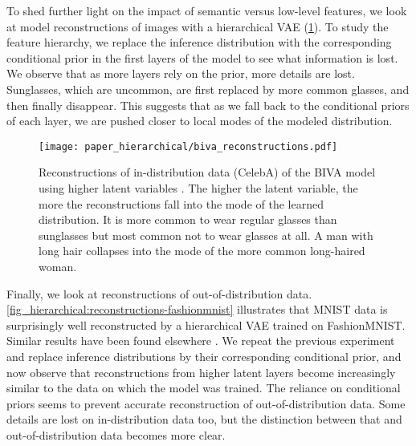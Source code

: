 {To shed further light on the impact of semantic versus low-level features, we look at model reconstructions of images with a hierarchical VAE (\cref{fig_hierarchical:biva-reconstructions-celeba}).
To study the feature hierarchy, we replace the inference distribution with the corresponding conditional prior in the first layers of the model to see what information is lost.
We observe that as more layers rely on the prior, more details are lost.
Sunglasses, which are uncommon, are first replaced by more common glasses, and then finally disappear.
This suggests that as we fall back to the conditional priors of each layer, we are pushed closer to local modes of the modeled distribution.

\begin{figure}[t]
    \centering
    \texttt{[image: paper\_hierarchical/biva\_reconstructions.pdf]}
    \vspace{0mm}
    \caption[Reconstructions of in-distribution data (CelebA) of the BIVA model using higher latent variables.]{Reconstructions of in-distribution data (CelebA) of the BIVA model using higher latent variables  \cite{maaloe_biva_2019}.
    The higher the latent variable, the more the reconstructions fall into the mode of the learned distribution.
    It is more common to wear regular glasses than sunglasses but most common not to wear glasses at all.
    A man with long hair collapses into the mode of the more common long-haired woman.}
    \vspace{0mm}
    \label{fig_hierarchical:biva-reconstructions-celeba}
\end{figure}
Finally, we look at reconstructions of out-of-distribution data.
\cref{fig_hierarchical:reconstructions-fashionmnist} illustrates that MNIST data is surprisingly well reconstructed by a hierarchical VAE trained on FashionMNIST.
Similar results have been found elsewhere \cite{xiao_likelihood_2020}.
We repeat the previous experiment and replace inference distributions by their corresponding conditional prior, and now observe that reconstructions from higher latent layers become increasingly similar to the data on which the model was trained.
The reliance on conditional priors seems to prevent accurate reconstruction of out-of-distribution data.
Some details are lost on in-distribution data too, but the distinction between that and out-of-distribution data becomes more clear.

}
